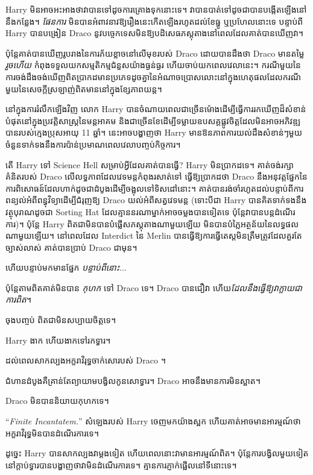 {{{{{{Harry មិន​អាច​អះអាង​ថា​វា​បាន​ទៅ​ដូច​ការ​គ្រោង​ទុក​នោះ​ទេ។ វា​បាន​បាត់​ទៅ​ដូច​ជា​បាន​បង្កើត​ឡើង​នៅ​នឹង​កន្លែង។ \emph{ផែនការ} មិនបានអំពាវនាវឱ្យរឿងនេះកើតឡើងរហូតដល់ខែធ្នូ ឬប្រហែលនោះទេ បន្ទាប់ពី Harry បានបង្រៀន Draco នូវបច្ចេកទេសមិនឱ្យបដិសេធភស្តុតាងនៅពេលដែលគាត់បានឃើញវា។

ប៉ុន្តែគាត់បានឃើញរូបរាងនៃការភ័យខ្លាចនៅលើមុខរបស់ Draco ដោយបានដឹងថា Draco មានតម្លៃ\emph{រួចហើយ} កំពុងទទួលយកសម្មតិកម្មជំនួសយ៉ាងធ្ងន់ធ្ងរ ហើយចាប់យកពេលវេលានេះ។ ករណីមួយនៃការចង់ដឹងចង់ឃើញពិតប្រាកដមានប្រភេទដូចគ្នានៃអំណាចប្រោសលោះនៅក្នុងហេតុផលដែលករណីមួយនៃសេចក្ដីស្រឡាញ់ពិតមាននៅក្នុងខ្សែភាពយន្ត។

នៅក្នុងការរំលឹកឡើងវិញ លោក Harry បានចំណាយពេលជាច្រើនម៉ោងដើម្បីធ្វើការរកឃើញដ៏សំខាន់បំផុតនៅក្នុងប្រវត្តិសាស្រ្តនៃមន្តអាគម និងជាច្រើនខែដើម្បីទម្លាយឧបសគ្គផ្លូវចិត្តដែលមិនអាចអភិវឌ្ឍបានរបស់ក្មេងប្រុសអាយុ 11 ឆ្នាំ។ នេះអាចបង្ហាញថា Harry មានឱនភាពការយល់ដឹងសំខាន់ៗមួយចំនួនទាក់ទងនឹងការប៉ាន់ប្រមាណពេលវេលាបញ្ចប់កិច្ចការ។

តើ Harry ទៅ Science Hell សម្រាប់អ្វីដែលគាត់បានធ្វើ? Harry មិនប្រាកដទេ។ គាត់ចង់រក្សាគំនិតរបស់ Draco លើលទ្ធភាពដែលវេទមន្តកំពុងរសាត់ទៅ ធ្វើឱ្យប្រាកដថា Draco នឹងអនុវត្តផ្នែកនៃការពិសោធន៍ដែលហាក់ដូចជាដំបូងដើម្បីចង្អុលទៅទិសដៅនោះ។ គាត់បានរង់ចាំរហូតដល់បន្ទាប់ពីការពន្យល់អំពីពន្ធុវិទ្យាដើម្បីជំរុញឱ្យ Draco យល់អំពីសត្វវេទមន្ត (ទោះបីជា Harry បានគិតទាក់ទងនឹងវត្ថុបុរាណដូចជា Sorting Hat ដែលគ្មាននរណាម្នាក់អាចចម្លងបានទៀតទេ ប៉ុន្តែវាបានបន្តដំណើរការ)។ ប៉ុន្តែ Harry ពិតជាមិនបានបំផ្លើសភស្តុតាងណាមួយឡើយ មិនបានបំភ្លៃអត្ថន័យនៃលទ្ធផលណាមួយឡើយ។ នៅពេលដែល Interdict នៃ Merlin បានធ្វើឱ្យការធ្វើតេស្តមិនត្រឹមត្រូវដែលគួរតែច្បាស់លាស់ គាត់បានប្រាប់ Draco ជាមុន។

ហើយបន្ទាប់មកមានផ្នែក \emph{បន្ទាប់ពីនោះ}...

ប៉ុន្តែតាមពិតគាត់មិនបាន \emph{កុហក} ទៅ Draco ទេ។ Draco បានជឿវា ហើយ\emph{ដែលនឹងធ្វើឱ្យវាក្លាយជាការពិត}។

ចុងបញ្ចប់ ពិត​ជា​មិន​សប្បាយ​ចិត្ត​ទេ។

Harry ងាក ហើយងាកទៅរកទ្វារ។

ដល់ពេលសាកល្បងអក្ខរាវិរុទ្ធចាក់សោរបស់ Draco ។

ជំហានដំបូងគឺគ្រាន់តែព្យាយាមបង្វិលកូនសោទ្វារ។ Draco អាច​នឹង​មាន​ការ​មិន​ស្អាត។

Draco មិន​បាន​និយាយ​កុហក​ទេ។

“\emph{Finite Incantatem.}” សំឡេងរបស់ Harry ចេញមកយ៉ាងស្អក ហើយគាត់អាចមានអារម្មណ៍ថាអក្ខរាវិរុទ្ធមិនបានដំណើរការទេ។

ដូច្នេះ Harry បានសាកល្បងវាម្តងទៀត ហើយពេលនោះវាមានអារម្មណ៍ពិត។ ប៉ុន្តែ​ការ​បង្វិល​មួយ​ទៀត​នៅ​ក្ដាប់​ទ្វារ​បាន​បង្ហាញ​ថា​វា​មិន​ដំណើរការ​ទេ។ គ្មានការភ្ញាក់ផ្អើលនៅទីនោះទេ។

}}}}}}
